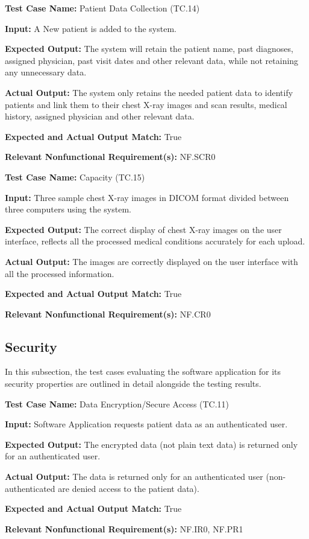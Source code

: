 \documentclass[12pt, titlepage]{article}
\begin{document}
\begin{mdframed}[linewidth=0.5mm]
  \textbf{Test Case Name:} Patient Data Collection (TC.14) \par
  \textbf{Input:} A New patient is added to the system. \par
  \textbf{Expected Output:} The system will retain the patient name, past diagnoses, assigned physician, past visit dates and other relevant data, while not retaining any unnecessary data. \par
  \textbf{Actual Output:} The system only retains the needed patient data to identify patients and link them to their chest X-ray images and scan results, medical history, assigned physician and other relevant data. \par
  \textbf{Expected and Actual Output Match:} True \par
  \textbf{Relevant Nonfunctional Requirement(s):} NF.SCR0
\end{mdframed}

\begin{mdframed}[linewidth=0.5mm]
  \textbf{Test Case Name:} Capacity (TC.15) \par
  \textbf{Input:} Three sample chest X-ray images in DICOM format divided between three computers using the system. \par
  \textbf{Expected Output:} The correct display of chest X-ray images on the user interface, reflects all the processed medical conditions accurately for each upload. \par
  \textbf{Actual Output:} The images are correctly displayed on the user interface with all the processed information. \par
  \textbf{Expected and Actual Output Match:} True \par
  \textbf{Relevant Nonfunctional Requirement(s):} NF.CR0
\end{mdframed}

\subsection{Security}
In this subsection, the test cases evaluating the software application for its security properties are outlined in detail alongside the testing results. \\

\begin{mdframed}[linewidth=0.5mm]
  \textbf{Test Case Name:} Data Encryption/Secure Access (TC.11) \par
  \textbf{Input:} Software Application requests patient data as an authenticated user. \par
  \textbf{Expected Output:} The encrypted data (not plain text data) is returned only for an authenticated user. \par
  \textbf{Actual Output:} The data is returned only for an authenticated user (non-authenticated are denied access to the patient data). \par
  \textbf{Expected and Actual Output Match:} True \par
  \textbf{Relevant Nonfunctional Requirement(s):} NF.IR0, NF.PR1
\end{mdframed}
\end{document}
